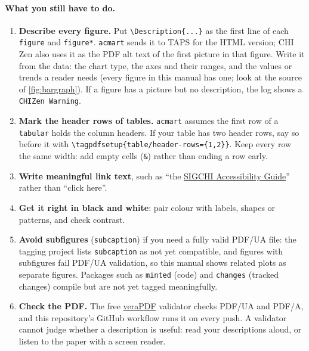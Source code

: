 \paragraph{What you still have to do.}
\begin{enumerate}
    \item \textbf{Describe every figure.} Put \texttt{\textbackslash Description\{...\}} as the first line of each \texttt{figure} and \texttt{figure*}. \texttt{acmart} sends it to TAPS for the HTML version; CHI Zen also uses it as the PDF alt text of the first picture in that figure. Write it from the data: the chart type, the axes and their ranges, and the values or trends a reader needs (every figure in this manual has one; look at the source of \autoref{fig:bargraph}). If a figure has a picture but no description, the log shows a \texttt{CHIZen Warning}.
    \item \textbf{Mark the header rows of tables.} \texttt{acmart} assumes the first row of a \texttt{tabular} holds the column headers. If your table has two header rows, say so before it with \texttt{\textbackslash tagpdfsetup\{table/header-rows=\{1,2\}\}}. Keep every row the same width: add empty cells (\texttt{\&}) rather than ending a row early.
    \item \textbf{Write meaningful link text}, such as ``the \href{https://sigchi.org/resources/guides-for-authors/accessibility/}{SIGCHI Accessibility Guide}'' rather than ``click here''.
    \item \textbf{Get it right in black and white}: pair colour with labels, shapes or patterns, and check contrast.
    \item \textbf{Avoid subfigures} (\texttt{subcaption}) if you need a fully valid PDF/UA file: the tagging project lists \texttt{subcaption} as not yet compatible, and figures with subfigures fail PDF/UA validation, so this manual shows related plots as separate figures. Packages such as \texttt{minted} (code) and \texttt{changes} (tracked changes) compile but are not yet tagged meaningfully.
    \item \textbf{Check the PDF.} The free \href{https://verapdf.org}{veraPDF} validator checks PDF/UA and PDF/A, and this repository's GitHub workflow runs it on every push. A validator cannot judge whether a description is useful: read your descriptions aloud, or listen to the paper with a screen reader.
\end{enumerate}

